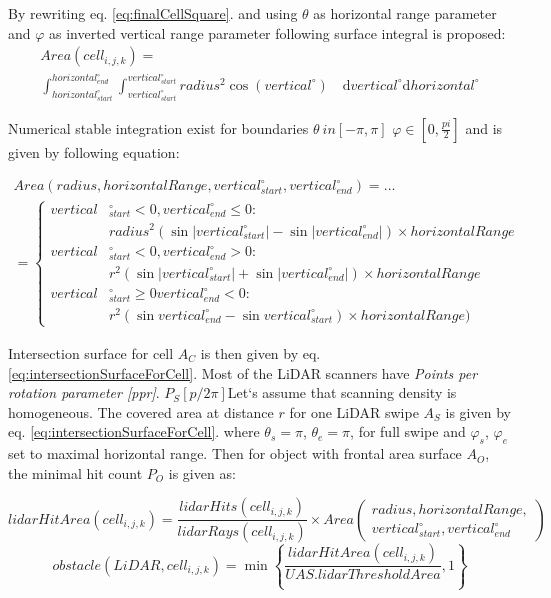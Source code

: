 \noindent By rewriting eq. \ref{eq:finalCellSquare}. and using $\theta$ as horizontal range parameter and $\varphi$ as inverted vertical range parameter following surface integral is proposed:
\begin{multline}
    Area(cell_{i,j,k}) =\\ \int_{horizontal_{start}^\circ}^{horizontal_{end}^\circ}\int_{vertical_{start}^\circ}^{vertical_{start}^\circ} radius^2 \cos(vertical^\circ) \quad \text{d} vertical^
    \circ\text{d} horizontal^\circ
\end{multline}

\noindent Numerical stable integration exist for boundaries $\theta \ in [-\pi,\pi]$ $\varphi \in [0,\frac{pi}{2}]$ and is given by following equation:

\begin{multline}\label{eq:intersectionSurfaceForCell}
    Area(radius,horizontal Range, vertical_{start}^\circ, vertical_{end}^\circ) =\dots\\ 
    =\left\{
    \begin{aligned}
        vertical&_{start}^\circ <0, vertical_{end}^\circ \le 0 :\\ 
            &radius^2(\sin |vertical_{start}^\circ| - \sin|vertical_{end}^\circ|)\times horizontal Range\\
         vertical&_{start}^\circ <0, vertical_{end}^\circ > 0   :\\
            & r^2(\sin |vertical_{start}^\circ| + \sin|vertical_{end}^\circ|)\times horizontal Range\\
         vertical&_{start}^\circ \ge 0 vertical_{end}^\circ < 0 :\\
            & r^2(\sin vertical_{end}^\circ- \sin vertical_{start}^\circ)\times horizontal Range)
    \end{aligned}
    \right.
\end{multline}

\noindent Intersection surface for cell $A_C$ is then given by eq. \ref{eq:intersectionSurfaceForCell}. Most of the LiDAR scanners have \textit{Points per rotation parameter [ppr]}. $P_S[p/2\pi]$Let`s  assume that scanning density is homogeneous. The covered area at distance $r$ for one LiDAR swipe $A_S$ is given by eq. \ref{eq:intersectionSurfaceForCell}. where $\theta_s=\pi$, $\theta_e=\pi$, for full swipe and $\varphi_s$, $\varphi_e$ set to maximal horizontal range. Then for object with frontal area surface $A_O$, the minimal hit count $P_O$ is given as:

\begin{equation}
    lidar Hit Area(cell_{i,j,k}) = \frac{lidar Hits(cell_{i,j,k})}{lidar Rays(cell_{i,j,k})} \times Area\left(\begin{gathered}radius,horizontal Range,\\ vertical_{start}^\circ, vertical_{end}^\circ\end{gathered}\right)
\end{equation}
\begin{equation}\label{eq:lidarHitFormula}
    obstacle(LiDAR,cell_{i,j,k})=\min\left\{\frac{lidar Hit Area(cell_{i,j,k})}{UAS.lidar Threshold Area},1\right\}
\end{equation}

